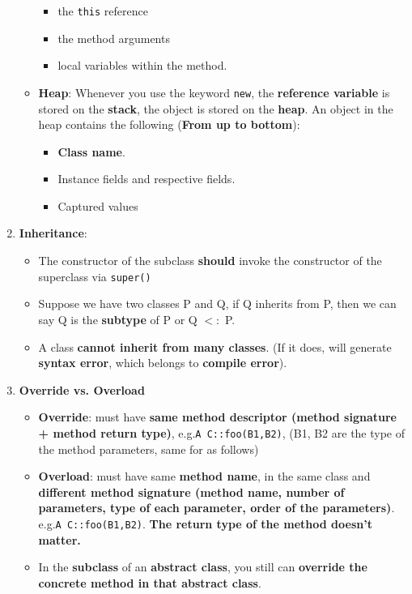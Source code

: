 \documentclass[10pt, landscape]{article}
\begin{document}
\begin{multicols}{4}
\begin{enumerate}
\begin{itemize}
        \begin{itemize}
            \item the \texttt{this} reference
            \item the method arguments
            \item local variables within the method.
        \end{itemize}
        \item \textbf{Heap}: Whenever you use the keyword \texttt{new}, the \textbf{reference variable} is stored on the \textbf{stack}, the object is stored on the \textbf{heap}. An object in the heap contains the following (\textbf{From up to bottom}):
        \begin{itemize}
            \item \textbf{Class name}.
            \item Instance fields and respective fields.
            \item Captured values
        \end{itemize}
    \end{itemize}
    \item \textbf{Inheritance}:
    \begin{itemize}
        \item The constructor of the subclass \textbf{should} invoke the constructor of the superclass via \texttt{super()}
        \item Suppose we have two classes P and Q, if Q inherits from P, then we can say Q is the \textbf{subtype} of P or Q $<:$ P.
        \item A class \textbf{cannot inherit from many classes}. (If it does, will generate \textbf{syntax error}, which belongs to \textbf{compile error}).
    \end{itemize}
    \item \textbf{Override vs. Overload}
    \begin{itemize}
        \item \textbf{Override}: must have \textbf{same method descriptor (method signature + method return type)}, e.g.\texttt{A C::foo(B1,B2)}, (B1, B2 are the type of the method parameters, same for as follows)
        \item \textbf{Overload}: must have same \textbf{method name}, in the same class and \textbf{different method signature (method name, number of parameters, type of each parameter, order of the parameters)}. e.g.\texttt{A C::foo(B1,B2)}. \textbf{The return type of the method doesn't matter.}
        \item In the \textbf{subclass} of an \textbf{abstract class}, you still can \textbf{override the concrete method in that abstract class}.

\end{itemize}
\end{enumerate}
\end{multicols}
\end{document}
